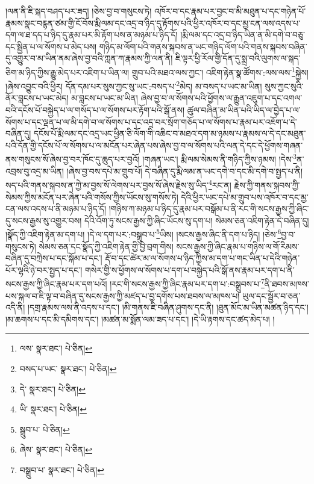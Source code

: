 །ལན་ནི་ཇི་སྐད་བཤད་པར་ཟད། །ཅེས་བྱ་བ་གསུངས་ཏེ། འཁོར་བ་དང་རྣམ་པར་བྱང་བ་མི་མཐུན་པ་དང་གཉེན་པོ་རྣམས་སྣང་བརྙན་ཙམ་གྱི་ངོ་བོས་རྨི་ལམ་དང་འདྲ་བ་ཉིད་དུ་རྟོགས་པའི་ཕྱིར་འཁོར་བ་དང་མྱ་ངན་ལས་འདས་པ་དག་ལ་ཐ་དད་པ་ཉིད་དུ་རྣམ་པར་མི་རྟོག་པས་ན་མཉམ་པ་ཉིད་དོ། །རྨི་ལམ་དང་འདྲ་བ་ཉིད་ཡིན་ན་མི་དགེ་བ་བཅུ་དང་སྦྱིན་པ་ལ་སོགས་པ་མེད་པས། གཉིད་མ་ལོག་པའི་གནས་སྐབས་ན་ཡང་གཉིད་ལོག་པའི་གནས་སྐབས་བཞིན་དུ་འགྱུར་བ་མ་ཡིན་ནམ་ཞེས་བྱ་བའི་ཀླན་ཀ་རྣམས་ཀྱི་ལན་ནི། ཇི་ལྟར་ཕྱི་རོལ་གྱི་དོན་དུ་སྨྲ་བའི་ལུགས་ལ་སྐད་ཅིག་མ་ཉིད་ཀྱིས་རྒྱུ་མེད་པར་འཇིག་པ་ཡིན་ལ། གྲུབ་པའི་མཐའ་ལས་ཀྱང་། འཇིག་རྟེན་སྣ་ཚོགས་:ལས་ལས་\footnote{ལས་  སྣར་ཐང་།  པེ་ཅིན། }སྐྱེས། །ཞེས་འབྱུང་བའི་ཕྱིར། དོན་དམ་པར་སུས་ཀྱང་སུ་ཡང་:བསད་པ་\footnote{བསད་པ་ཡང་  སྣར་ཐང་།  པེ་ཅིན། }མེད། མ་བསད་པ་ཡང་མ་ཡིན། སུས་ཀྱང་སུའི་ནོར་བླངས་པ་ཡང་མེད། མ་བླངས་པ་ཡང་མ་ཡིན། ཞེས་བྱ་བ་ལ་སོགས་པའི་ཕྱོགས་ལ་རྒྱུན་འཇུག་པ་དང་འགལ་བའི་དངོས་པོ་བསྐྱེད་པ་ལ་གསོད་པ་ལ་སོགས་པར་རྟོག་པའི་སྒོ་ནས། ཚུལ་བཞིན་མ་ཡིན་པའི་ཡིད་ལ་བྱེད་པ་ལ་སོགས་པ་དང་ལྡན་པ་ལ་མི་དགེ་བ་ལ་སོགས་པ་དང་འདྲ་བར་སྲོག་གཅོད་པ་ལ་སོགས་པ་རྣམ་པར་འཇོག་པ་དེ་བཞིན་དུ། དངོས་པོ་རྨི་ལམ་དང་འདྲ་ཡང་ཕྱིན་ཅི་ལོག་གི་འཆིང་བ་མཐའ་དག་མ་ཉམས་པ་རྣམས་ལ་དེ་དང་མཐུན་པའི་དོན་གྱི་དངོས་པོ་ལ་སོགས་པ་ལ་མངོན་པར་ཞེན་པས་ཞེས་བྱ་བ་ལ་སོགས་པའི་ལན་དེ་དང་དེ་ཕྱོགས་གཞན་ནས་གསུངས་སོ་ཞེས་བྱ་བར་ཁོང་དུ་ཆུད་པར་བྱའོ། །གཞན་ཡང་། རྨི་ལམ་སེམས་ནི་གཉིད་ཀྱིས་ཉམས། །དེས་\footnote{དེ་  སྣར་ཐང་།  པེ་ཅིན། }ན་འབྲས་བུ་འདྲ་མ་ཡིན། །ཞེས་བྱ་བས་དཔེ་མ་གྲུབ་པོ། དེ་བཞིན་དུ་རྨི་ལམ་ན་ཡང་དགེ་བ་དང་མི་དགེ་བ་སྤྱད་པ་ནི། སད་པའི་གནས་སྐབས་ན་ཀྱེ་མ་བྱས་སོ་ལེགས་པར་བྱས་སོ་ཞེས་རྗེས་སུ་ཡིད་\footnote{ཡི་  སྣར་ཐང་།  པེ་ཅིན། }རང་ན། རྗེས་ཀྱི་གནས་སྐབས་ཀྱི་སེམས་ཀྱིས་མངོན་པར་ཞེན་པའི་གསོས་ཀྱིས་ཡོངས་སུ་གསོས་ཏེ། དེའི་ཕྱིར་ཡང་དཔེ་མ་གྲུབ་པས་འཁོར་བ་དང་མྱ་ངན་ལས་འདས་པ་ནི་མཉམ་པ་ཉིད་དོ། །གཉིས་ཀ་མཉམ་པ་ཉིད་དུ་རྣམ་པར་བསྒོམ་པ་ནི་རང་གི་སངས་རྒྱས་ཀྱི་ཞིང་དུ་སངས་རྒྱས་སུ་འགྱུར་བས། དེའི་འོག་ཏུ་སངས་རྒྱས་ཀྱི་ཞིང་ཡོངས་སུ་དག་པ། སེམས་ཅན་འཇིག་རྟེན་དེ་བཞིན་དུ། །སྣོད་ཀྱི་འཇིག་རྟེན་མ་དག་པ། །དེ་ལ་དག་པར་:བསྒྲུབ་པ་\footnote{སྒྲུབ་པ་  པེ་ཅིན། }ཡིས། །སངས་རྒྱས་ཞིང་ནི་དག་པ་ཉིད། །ཅེས་\footnote{ཞེས་  སྣར་ཐང་།  པེ་ཅིན། }བྱ་བ་གསུངས་ཏེ། སེམས་ཅན་དང་སྣོད་ཀྱི་འཇིག་རྟེན་གྱི་བྱེ་བྲག་གིས། སངས་རྒྱས་ཀྱི་ཞིང་རྣམ་པ་གཉིས་ལ་གོ་རིམས་བཞིན་དུ་བཀྲེས་པ་དང་སྐོམ་པ་དང་། རྡོ་བ་དང་ཚེར་མ་ལ་སོགས་པ་ཉིད་ཀྱིས་མ་དག་པ་གང་ཡིན་པ་དེའི་གཉེན་པོར་ལྷའི་ཉེ་བར་སྤྱད་པ་དང་། གསེར་གྱི་ས་ཕྱོགས་ལ་སོགས་པ་དག་པ་བསྐྱེད་པའི་སྒོ་ནས་རྣམ་པར་དག་པ་ནི་སངས་རྒྱས་ཀྱི་ཞིང་རྣམ་པར་དག་པའོ། །རང་གི་སངས་རྒྱས་ཀྱི་ཞིང་རྣམ་པར་དག་པ་:བསྒྲུབས་པ་\footnote{བསྒྲུབ་པ་  སྣར་ཐང་།  པེ་ཅིན། }ནི་ཐབས་མཁས་པས་སྐལ་བ་ཇི་ལྟ་བ་བཞིན་དུ་སངས་རྒྱས་ཀྱི་མཛད་པ་བྱ་དགོས་པས་ཐབས་ལ་མཁས་པ། ཡུལ་དང་སྦྱོར་བ་ཅན་འདི་ནི། །དགྲ་རྣམས་ལས་ནི་འདས་པ་དང་། །མི་གནས་ཇི་བཞིན་ཤུགས་དང་ནི། །ཐུན་མོང་མ་ཡིན་མཚན་ཉིད་དང་། །མ་ཆགས་པ་དང་མི་དམིགས་དང་། །མཚན་མ་སྨོན་ལམ་ཟད་པ་དང་། །དེ་ཡི་རྟགས་དང་ཚད་མེད་པ། །
